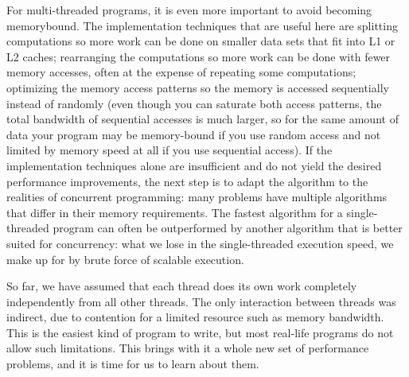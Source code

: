 For multi-threaded programs, it is even more important to avoid becoming memorybound. The implementation techniques that are useful here are splitting computations so more work can be done on smaller data sets that fit into L1 or L2 caches; rearranging the computations so more work can be done with fewer memory accesses, often at the expense of repeating some computations; optimizing the memory access patterns so the memory is accessed sequentially instead of randomly (even though you can saturate both access patterns, the total bandwidth of sequential accesses is much larger, so for the same amount of data your program may be memory-bound if you use random access and not limited by memory speed at all if you use sequential access). If the implementation techniques alone are insufficient and do not yield the desired performance improvements, the next step is to adapt the algorithm to the realities of concurrent programming: many problems have multiple algorithms that differ in their memory requirements. The fastest algorithm for a single-threaded program can often be outperformed by another algorithm that is better suited for concurrency: what we lose in the single-threaded execution speed, we make up for by brute force of scalable execution.

So far, we have assumed that each thread does its own work completely independently from all other threads. The only interaction between threads was indirect, due to contention for a limited resource such as memory bandwidth. This is the easiest kind of program to write, but most real-life programs do not allow such limitations. This brings with it a whole new set of performance problems, and it is time for us to learn about them.



















